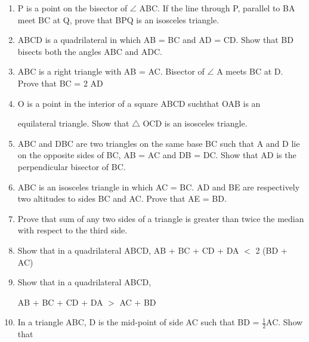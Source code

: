 \documentclass[11pt] {article}
\begin{document}
\begin {enumerate}
\begin{minipage}[h]{0.70\linewidth}
[\textcolor{cyan}{Hint:} Recall how $\angle$ B = $\angle$ C is proved whenAB = AC]
\end{minipage}
\hfill
\begin{minipage}[h]{0.30\linewidth}                             \texttt{[image: 7B]}          
\end{minipage}
\item P is a point on the bisector of $\angle$ ABC. If the line through P, parallel to BA meet BC at Q, prove that BPQ is an isosceles triangle.
\item ABCD is a quadrilateral in which AB = BC and AD = CD. Show that BD bisects both the angles ABC and ADC.
\item ABC is a right triangle with AB = AC. Bisector of $\angle$ A meets BC at D. Prove that BC = 2 AD
\item O is a point in the interior of a square ABCD suchthat OAB is an 

equilateral triangle. Show that $\triangle$  OCD is an isosceles triangle.
\item ABC and DBC are two triangles on the same base BC such that A and D lie on the opposite sides of BC, AB = AC and DB = DC. Show that AD is the perpendicular bisector of BC.
\item ABC is an isosceles triangle in which AC = BC. AD and BE are respectively two altitudes to sides BC and AC. Prove that AE = BD.
\item Prove that sum of any two sides of a triangle is greater than twice the median with respect to the third side.
\item Show that in a quadrilateral ABCD, AB + BC + CD + DA $<$ 2 (BD + AC)
\item Show that in a quadrilateral ABCD,

AB + BC + CD + DA $>$ AC + BD
\item In a triangle ABC, D is the mid-point of side AC such that BD = $\frac{1}{2}$AC. Show that


\end{enumerate}
\end{document}
